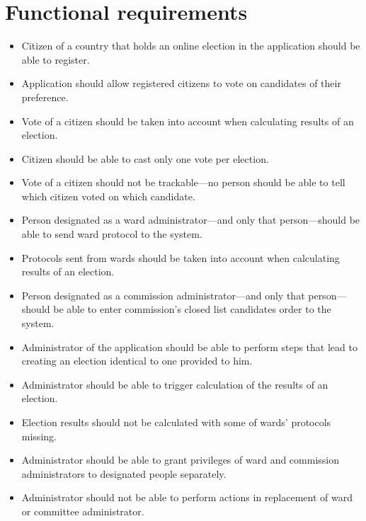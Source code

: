 \documentclass[a4paper,twoside,12pt]{book}
\begin{document}
  \section{Functional requirements}
    \begin{itemize}
      \item Citizen of a country that holds an online election in the application should be able to register.
      \item Application should allow registered citizens to vote on candidates of their preference.
      \item Vote of a citizen should be taken into account when calculating results of an election.
      \item Citizen should be able to cast only one vote per election.
      \item Vote of a citizen should not be trackable---no person should be able to tell which citizen voted on which candidate.
      \item Person designated as a ward administrator---and only that person---should be able to send ward protocol to the system.
      \item Protocols sent from wards should be taken into account when calculating results of an election.
      \item Person designated as a commission administrator---and only that person---should be able to enter commission's closed list candidates order to the system.
      \item Administrator of the application should be able to perform steps that lead to creating an election identical to one provided to him.
      \item Administrator should be able to trigger calculation of the results of an election.
      \item Election results should not be calculated with some of wards' protocols missing.
      \item Administrator should be able to grant privileges of ward and commission administrators to designated people separately.
      \item Administrator should not be able to perform actions in replacement of ward or committee administrator.
    \end{itemize}
\end{document}
